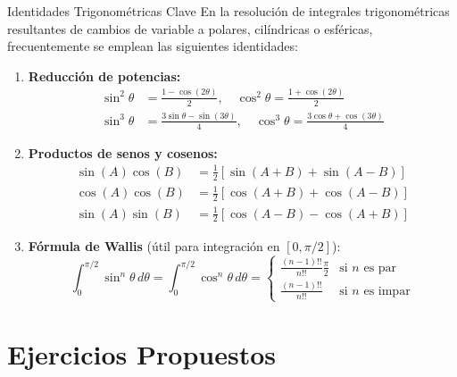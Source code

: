 \documentclass[11pt,a4paper]{article}
\begin{document}
\begin{definicionbox}{Identidades Trigonométricas Clave}
En la resolución de integrales trigonométricas resultantes de cambios de variable a polares, cilíndricas o esféricas, frecuentemente se emplean las siguientes identidades:
\begin{enumerate}
    \item \textbf{Reducción de potencias:}
    \begin{align*}
        \sin^2 \theta &= \frac{1 - \cos(2\theta)}{2}, \quad \cos^2 \theta = \frac{1 + \cos(2\theta)}{2} \\
        \sin^3 \theta &= \frac{3\sin \theta - \sin(3\theta)}{4}, \quad \cos^3 \theta = \frac{3\cos \theta + \cos(3\theta)}{4}
    \end{align*}
    \item \textbf{Productos de senos y cosenos:}
    \begin{align*}
        \sin(A)\cos(B) &= \frac{1}{2}\left[\sin(A+B) + \sin(A-B)\right] \\
        \cos(A)\cos(B) &= \frac{1}{2}\left[\cos(A+B) + \cos(A-B)\right] \\
        \sin(A)\sin(B) &= \frac{1}{2}\left[\cos(A-B) - \cos(A+B)\right]
    \end{align*}
    \item \textbf{Fórmula de Wallis} (útil para integración en $[0, \pi/2]$):
    \[
    \int_0^{\pi/2} \sin^n \theta \, d\theta = \int_0^{\pi/2} \cos^n \theta \, d\theta = 
    \begin{cases}
    \frac{(n-1)!!}{n!!}\frac{\pi}{2} & \text{si } n \text{ es par} \\
    \frac{(n-1)!!}{n!!} & \text{si } n \text{ es impar}
    \end{cases}
    \]
\end{enumerate}
\end{definicionbox}

\section{Ejercicios Propuestos}
\end{document}
